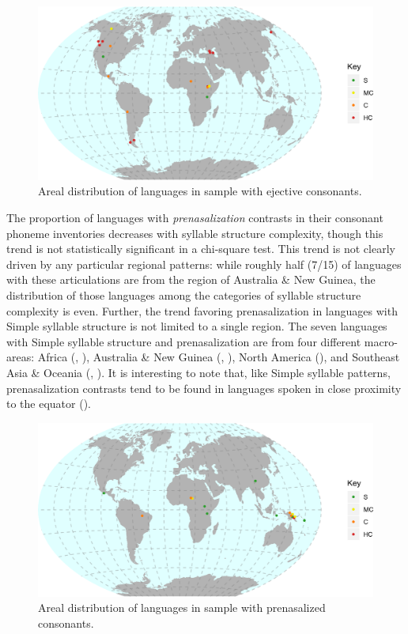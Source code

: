 \begin{figure}  
\includegraphics[width=\textwidth]{figures/fig414.png}
\caption{\label{fig:4.14}Areal distribution of languages in sample with ejective consonants.}
\end{figure}

  The proportion of languages with \textit{prenasalization} contrasts in their consonant phoneme inventories decreases with syllable structure complexity, though this trend is not statistically significant in a chi-square test. This trend is not clearly driven by any particular regional patterns: while roughly half (7/15) of languages with these articulations are from the region of Australia \& New Guinea, the distribution of those languages among the categories of syllable structure complexity is even. Further, the trend favoring prenasalization in languages with Simple syllable structure is not limited to a single region. The seven languages with Simple syllable structure and prenasalization are from four different macro-areas: Africa (, ), Australia \& New Guinea (, ), North America (), and Southeast Asia \& Oceania (, ). It is interesting to note that, like Simple syllable patterns, prenasalization contrasts tend to be found in languages spoken in close proximity to the equator ().


\begin{figure}  
\includegraphics[width=\textwidth]{figures/fig415.png}
\caption{\label{fig:4.15}Areal distribution of languages in sample with prenasalized consonants.}
\end{figure}

